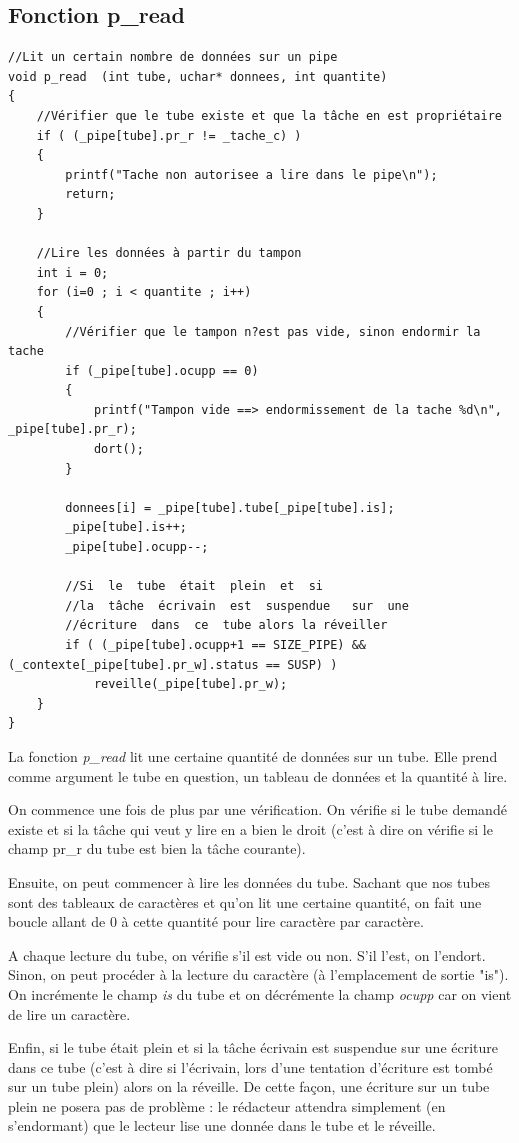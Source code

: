\documentclass[a4paper,12pt]{report}
\begin{document}
\subsection{Fonction p\_read}
\begin{lstlisting}
//Lit un certain nombre de données sur un pipe
void p_read  (int tube, uchar* donnees, int quantite)
{
	//Vérifier que le tube existe et que la tâche en est propriétaire
	if ( (_pipe[tube].pr_r != _tache_c) )
	{
		printf("Tache non autorisee a lire dans le pipe\n");
		return;
	}

	//Lire les données à partir du tampon
	int i = 0;
	for (i=0 ; i < quantite ; i++)
	{
		//Vérifier que le tampon n?est pas vide, sinon endormir la tache
		if (_pipe[tube].ocupp == 0)
		{
			printf("Tampon vide ==> endormissement de la tache %d\n", _pipe[tube].pr_r);
			dort();
		}

		donnees[i] = _pipe[tube].tube[_pipe[tube].is];
		_pipe[tube].is++;
		_pipe[tube].ocupp--;

		//Si  le  tube  était  plein  et  si
		//la  tâche  écrivain  est  suspendue	sur  une
		//écriture  dans  ce  tube alors la réveiller 
		if ( (_pipe[tube].ocupp+1 == SIZE_PIPE) && (_contexte[_pipe[tube].pr_w].status == SUSP) )
			reveille(_pipe[tube].pr_w);
	}
}
\end{lstlisting}

La fonction \textit{p\_read} lit une certaine quantité de données sur un tube. Elle prend comme argument le tube en question, un tableau de données et la quantité à lire.

On commence une fois de plus par une vérification. On vérifie si le tube demandé existe et si la tâche qui veut y lire en a bien le droit (c'est à dire on vérifie si le champ pr\_r du tube est bien la tâche courante).

Ensuite, on peut commencer à lire les données du tube. Sachant que nos tubes sont des tableaux de caractères et qu'on lit une certaine quantité, on fait une boucle allant de 0 à cette quantité pour lire caractère par caractère.

A chaque lecture du tube, on vérifie s'il est vide ou non. S'il l'est, on l'endort. Sinon, on peut procéder à la lecture du caractère (à l'emplacement de sortie "is"). On incrémente le champ \textit{is} du tube et on décrémente la champ \textit{ocupp} car on vient de lire un caractère.

Enfin, si  le  tube  était  plein  et  si la  tâche  écrivain  est  suspendue sur une écriture dans ce tube (c'est à dire si l'écrivain, lors d'une tentation d'écriture est tombé sur un tube plein) alors on la réveille. De cette façon, une écriture sur un tube plein ne posera pas de problème : le rédacteur attendra simplement (en s'endormant) que le lecteur lise une donnée dans le tube et le réveille.
\end{document}
